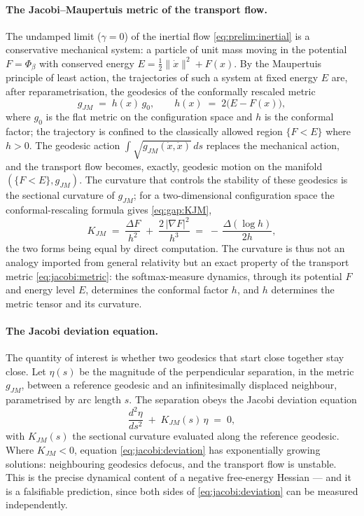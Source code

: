 \paragraph{The Jacobi--Maupertuis metric of the transport flow.}
The undamped limit ($\gamma=0$) of the inertial flow
\eqref{eq:prelim:inertial} is a conservative mechanical system: a particle
of unit mass moving in the potential $F=\Phi_\beta$ with conserved energy
$E=\tfrac12\|\dot x\|^2+F(x)$. By the Maupertuis principle of least
action, the trajectories of such a system at fixed energy $E$ are, after
reparametrisation, the geodesics of the conformally rescaled metric
\begin{equation}
  g_{JM} \;=\; h(x)\,g_0,
  \qquad
  h(x) \;=\; 2\bigl(E-F(x)\bigr),
  \label{eq:jacobi:metric}
\end{equation}
where $g_0$ is the flat metric on the configuration space and $h$ is the
conformal factor; the trajectory is confined to the classically allowed
region $\{F<E\}$ where $h>0$. The geodesic action
$\int\sqrt{g_{JM}(\dot x,\dot x)}\,ds$ replaces the mechanical action, and
the transport flow becomes, exactly, geodesic motion on the manifold
$(\{F<E\},g_{JM})$. The curvature that controls the stability of these
geodesics is the sectional curvature of $g_{JM}$; for a two-dimensional
configuration space the conformal-rescaling formula gives
\eqref{eq:gap:KJM},
\begin{equation*}
  K_{JM}
   \;=\; \frac{\Delta F}{h^2} \;+\; \frac{2\,|\nabla F|^2}{h^3}
   \;=\; -\,\frac{\Delta(\log h)}{2h},
\end{equation*}
the two forms being equal by direct computation. The curvature is thus
not an analogy imported from general relativity but an exact property of
the transport metric \eqref{eq:jacobi:metric}: the softmax-measure
dynamics, through its potential $F$ and energy level $E$, determines the
conformal factor $h$, and $h$ determines the metric tensor and its
curvature.

\paragraph{The Jacobi deviation equation.}
The quantity of interest is whether two geodesics that start close
together stay close. Let $\eta(s)$ be the magnitude of the perpendicular
separation, in the metric $g_{JM}$, between a reference geodesic and an
infinitesimally displaced neighbour, parametrised by arc length $s$. The
separation obeys the Jacobi deviation equation
\begin{equation}
  \frac{d^2\eta}{ds^2} \;+\; K_{JM}(s)\,\eta \;=\; 0,
  \label{eq:jacobi:deviation}
\end{equation}
with $K_{JM}(s)$ the sectional curvature evaluated along the reference
geodesic. Where $K_{JM}<0$, equation \eqref{eq:jacobi:deviation} has
exponentially growing solutions: neighbouring geodesics defocus, and the
transport flow is unstable. This is the precise dynamical content of a
negative free-energy Hessian --- and it is a falsifiable prediction, since
both sides of \eqref{eq:jacobi:deviation} can be measured independently.

